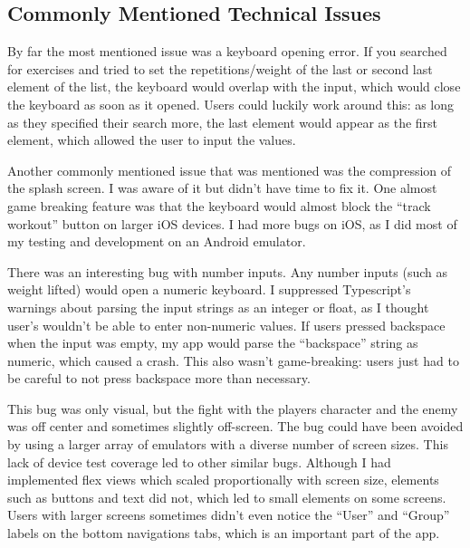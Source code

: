 \documentclass{l4proj}
\begin{document}
\subsection{Commonly Mentioned Technical Issues}
By far the most mentioned issue was a keyboard opening error. If you searched for exercises and tried to set the repetitions/weight of the last or second last element of the list, the keyboard would overlap with the input, which would close the keyboard as soon as it opened. Users could luckily work around this: as long as they specified their search more, the last element would appear as the first element, which allowed the user to input the values.

Another commonly mentioned issue that was mentioned was the compression of the splash screen. I was aware of it but didn't have time to fix it. 
One almost game breaking feature was that the keyboard would almost block the ``track workout'' button on larger iOS devices. I had more bugs on iOS, as I did most of my testing and development on an Android emulator.

There was an interesting bug with number inputs. Any number inputs (such as weight lifted) would open a numeric keyboard. I suppressed Typescript's warnings about parsing the input strings as an integer or float, as I thought user's wouldn't be able to enter non-numeric values. If users pressed backspace when the input was empty, my app would parse the ``backspace'' string as numeric, which caused a crash. This also wasn't game-breaking: users just had to be careful to not press backspace more than necessary.

This bug was only visual, but the fight with the players character and the enemy was off center and sometimes slightly off-screen. The bug could have been avoided by using a larger array of emulators with a diverse number of screen sizes. This lack of device test coverage led to other similar bugs. Although I had implemented flex views which scaled proportionally with screen size, elements such as buttons and text did not, which led to small elements on some screens. Users with larger screens sometimes didn't even notice the ``User'' and ``Group'' labels on the bottom navigations tabs, which is an important part of the app.
\end{document}
